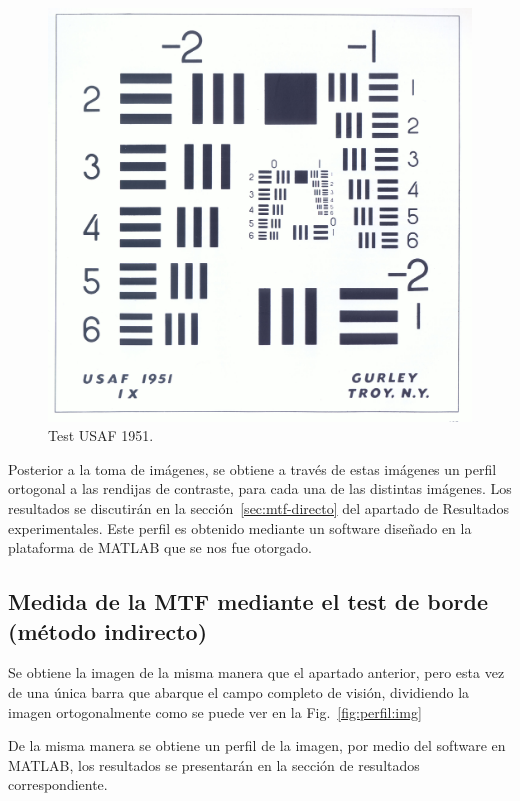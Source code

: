 \documentclass{./packages/optica-article}
\begin{document}
\begin{figure}[h]
	\centering
	\includegraphics[scale=0.08]{testusaf1951}
	\caption{Test USAF 1951.}\label{fig:usaf1951}
\end{figure}

Posterior a la toma de imágenes, se obtiene a través de estas imágenes un perfil ortogonal a las rendijas de contraste, para cada una de las distintas imágenes. Los resultados se discutirán en la sección~\ref{sec:mtf-directo} del apartado de Resultados experimentales. Este perfil es obtenido mediante un software diseñado en la plataforma de MATLAB que se nos fue otorgado.


\subsection{Medida de la MTF mediante el test de borde (método indirecto)}\label{sec:description:indirecto}

Se obtiene la imagen de la misma manera que el apartado anterior, pero esta vez de una única barra que abarque el campo completo de visión, dividiendo la imagen ortogonalmente como se puede ver en la Fig.~\ref{fig:perfil:img}

De la misma manera se obtiene un perfil de la imagen, por medio del software en MATLAB, los resultados se presentarán en la sección de resultados correspondiente.
\end{document}
